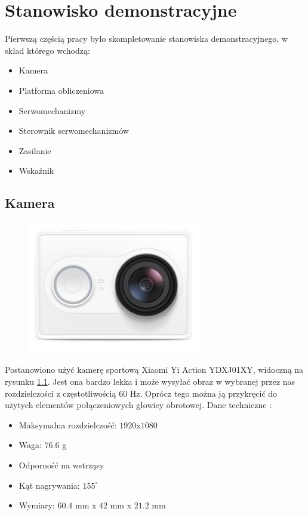 \chapter{Stanowisko demonstracyjne}
\label{cha:stanowiskodemonstracyjne}

Pierwszą częścią pracy było skompletowanie stanowiska demonstracyjnego, w skład którego wchodzą:
\begin{itemize}
	\item Kamera
	\item Platforma obliczeniowa
	\item Serwomechanizmy
	\item Sterownik serwomechanizmów
	\item Zasilanie
	\item Wskaźnik
\end{itemize}

\section{Kamera}
\label{sec:kamera}

\begin{figure}[H]
	\centering
	\includegraphics[width=3in]{Yi_action.jpg}
	\label{fig:yi_action}
\end{figure}

Postanowiono użyć kamerę sportową Xiaomi Yi Action YDXJ01XY, widoczną na rysunku \ref{fig:yi_action}. 
Jest ona bardzo lekka i może wysyłać obraz w wybranej przez nas rozdzielczości z częstotliwością 60 Hz. 
Oprócz tego można ją przykręcić do użytych elementów połączeniowych głowicy obrotowej. 
Dane techniczne \cite{Xiaomi}:
\begin{itemize}
\item Maksymalna rozdzielczość: \(1920\)x\(1080\)
\item Waga: \(76.6\) g
\item Odporność na wstrząsy
\item Kąt nagrywania: \(155^\circ\)
\item Wymiary: \(60.4\) mm x \(42\) mm x \(21.2\) mm
\end{itemize}

